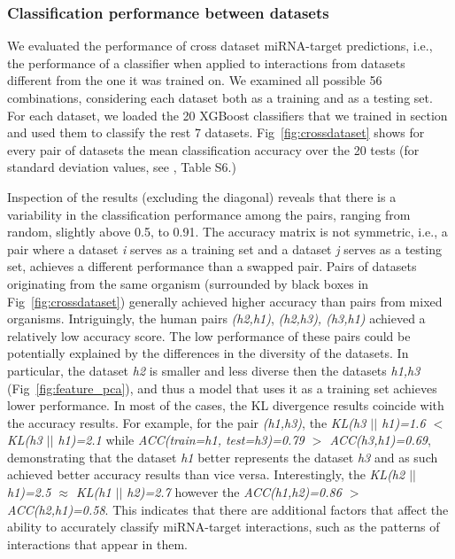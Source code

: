 \documentclass{bmcart}
\begin{document}
\subsubsection*{Classification performance between datasets}
We evaluated the performance of cross dataset miRNA-target predictions, i.e., the performance of a classifier when applied to interactions from datasets different from the one it was trained on.
We examined all possible 56 combinations, considering each dataset both as a training and as a testing set. 
For each dataset, we loaded the 20 XGBoost classifiers that we trained in section  and used them to classify the rest 7 datasets. Fig~\ref{fig:crossdataset} shows for every pair of datasets the mean classification accuracy over the 20 tests (for standard deviation values, see , Table S6.)


Inspection of the results (excluding the diagonal) reveals that there is a variability in the classification performance among the pairs, ranging from random, slightly above 0.5, to 0.91. The accuracy matrix is not symmetric, i.e., a pair where a dataset \textit{i} serves as a training set and a dataset \textit{j} serves as a testing set, achieves a different performance than a swapped pair. Pairs of datasets originating from the same organism (surrounded by black boxes in Fig~\ref{fig:crossdataset}) generally achieved higher accuracy than pairs from mixed organisms. Intriguingly, the human pairs \textit{(h2,h1)}, \textit{(h2,h3), \textit{(h3,h1)}} achieved a relatively low accuracy score. The low performance of these pairs could be potentially explained by the differences in the diversity of the datasets. In particular, the dataset \textit{h2} is smaller and less diverse then the datasets \textit{h1,h3} (Fig~\ref{fig:feature_pca}), and thus a model that uses it as a training set achieves lower performance. In most of the cases, the KL divergence results coincide with the accuracy results. For example, for the pair \textit{(h1,h3)}, the \textit{KL(h3 $||$ h1)=1.6 $<$ KL(h3 $||$ h1)=2.1} while \textit{ACC(train=h1, test=h3)=0.79 $>$ ACC(h3,h1)=0.69}, demonstrating that the dataset \textit{h1} better represents the dataset \textit{h3} and as such achieved better accuracy results than vice versa. Interestingly, the \textit{KL(h2 $||$ h1)=2.5 $\approx$ KL(h1 $||$ h2)=2.7} however the \textit{ACC(h1,h2)=0.86 $>$ ACC(h2,h1)=0.58}. This indicates that there are additional factors that affect the ability to accurately classify miRNA-target interactions, such as the patterns of interactions that appear in them.
\end{document}
